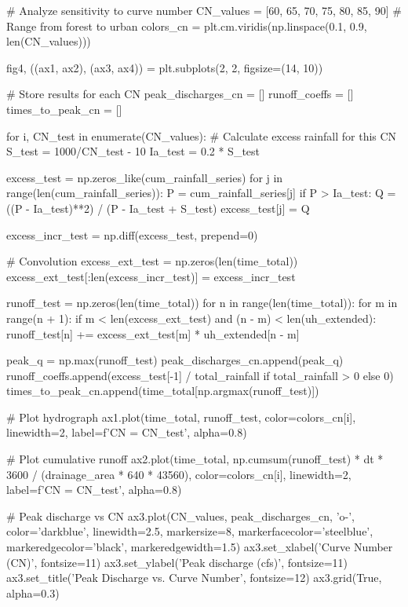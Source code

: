 \documentclass[a4paper, 11pt]{article}
\begin{document}
\begin{pycode}
# Analyze sensitivity to curve number
CN_values = [60, 65, 70, 75, 80, 85, 90]  # Range from forest to urban
colors_cn = plt.cm.viridis(np.linspace(0.1, 0.9, len(CN_values)))

fig4, ((ax1, ax2), (ax3, ax4)) = plt.subplots(2, 2, figsize=(14, 10))

# Store results for each CN
peak_discharges_cn = []
runoff_coeffs = []
times_to_peak_cn = []

for i, CN_test in enumerate(CN_values):
    # Calculate excess rainfall for this CN
    S_test = 1000/CN_test - 10
    Ia_test = 0.2 * S_test

    excess_test = np.zeros_like(cum_rainfall_series)
    for j in range(len(cum_rainfall_series)):
        P = cum_rainfall_series[j]
        if P > Ia_test:
            Q = ((P - Ia_test)**2) / (P - Ia_test + S_test)
            excess_test[j] = Q

    excess_incr_test = np.diff(excess_test, prepend=0)

    # Convolution
    excess_ext_test = np.zeros(len(time_total))
    excess_ext_test[:len(excess_incr_test)] = excess_incr_test

    runoff_test = np.zeros(len(time_total))
    for n in range(len(time_total)):
        for m in range(n + 1):
            if m < len(excess_ext_test) and (n - m) < len(uh_extended):
                runoff_test[n] += excess_ext_test[m] * uh_extended[n - m]

    peak_q = np.max(runoff_test)
    peak_discharges_cn.append(peak_q)
    runoff_coeffs.append(excess_test[-1] / total_rainfall if total_rainfall > 0 else 0)
    times_to_peak_cn.append(time_total[np.argmax(runoff_test)])

    # Plot hydrograph
    ax1.plot(time_total, runoff_test, color=colors_cn[i], linewidth=2,
             label=f'CN = {CN_test}', alpha=0.8)

    # Plot cumulative runoff
    ax2.plot(time_total, np.cumsum(runoff_test) * dt * 3600 / (drainage_area * 640 * 43560),
             color=colors_cn[i], linewidth=2, label=f'CN = {CN_test}', alpha=0.8)

# Peak discharge vs CN
ax3.plot(CN_values, peak_discharges_cn, 'o-', color='darkblue', linewidth=2.5,
         markersize=8, markerfacecolor='steelblue', markeredgecolor='black', markeredgewidth=1.5)
ax3.set_xlabel('Curve Number (CN)', fontsize=11)
ax3.set_ylabel('Peak discharge (cfs)', fontsize=11)
ax3.set_title('Peak Discharge vs. Curve Number', fontsize=12)
ax3.grid(True, alpha=0.3)


\end{pycode}
\end{document}
